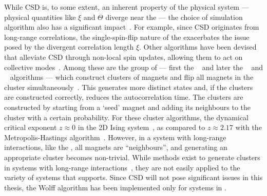 While CSD is, to some extent, an inherent property of the physical system --- physical quantities like $\xi$ and $\Theta$ diverge near the  --- the choice of simulation algorithm also has a significant impact~\cite{PhD_Reynal}.
For example, since CSD originates from long-range correlations, the single-spin-flip nature of the  exacerbates the issue posed by the divergent correlation length $\xi$.
Other algorithms have been devised that alleviate CSD through non-local spin updates, allowing them to act on collective modes~\cite{BeatCriticalSlowingDown1990}.
Among these are the group of  --- first the ~\cite{SwendsenWang} and later the ~\cite{niedermayer1988general} and ~\cite{Wolff} algorithms --- which construct clusters of magnets and flip all magnets in the cluster simultaneously~\cite{CompStatPhys}. %
This generates more distinct states and, if the clusters are constructed correctly, reduces the autocorrelation time.
The clusters are constructed by starting from a `seed' magnet and adding its neighbours to the cluster with a certain probability.
For these cluster algorithms, the dynamical critical exponent $z \approx 0$ in the 2D  Ising system~\cite{NumericalDynamicalNiedermayer}, as compared to $z\approx2.17$ with the Metropolis-Hastings algorithm~\cite{DynamicExponentMetropolis}.
However, in a system with long-range interactions, like the , all magnets are ``neighbours'', and generating an appropriate cluster becomes non-trivial.
While methods exist to generate clusters in systems with long-range interactions~\cite{MC_spinLongRange}, they are not easily applied to the variety of systems that \hotspice supports.
Since CSD will not pose significant issues in this thesis, the Wolff algorithm has been implemented only for  systems in \hotspice.

